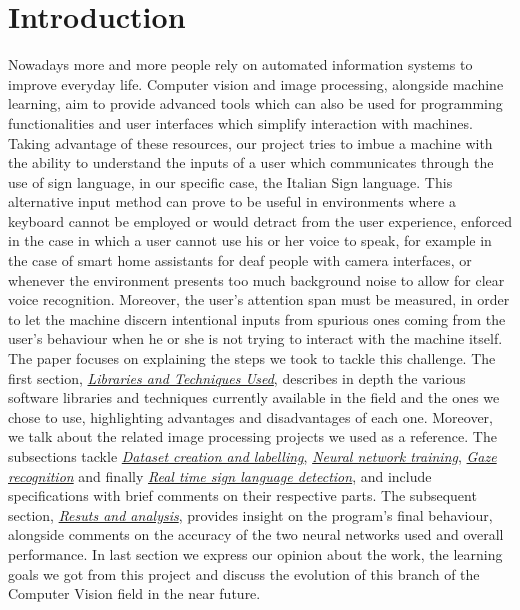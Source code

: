 \documentclass[a4paper, 12pt]{article}
\begin{document}
\section{Introduction}
\label{Introduction}
Nowadays more and more people rely on automated information systems to improve everyday life.
Computer vision and image processing, alongside machine learning, aim to provide advanced tools which can also be used for programming functionalities and user interfaces which simplify interaction with machines.
Taking advantage of these resources, our project tries to imbue a machine with the ability to understand the inputs of a user which communicates through the use of sign language, in our specific case, the Italian Sign language. This alternative input method can prove to be useful in environments where a keyboard cannot be employed or would detract from the user experience, enforced in the case in which a user cannot use his or her voice to speak, for example in the case of smart home assistants for deaf people with camera interfaces, or whenever the environment presents too much background noise to allow for clear voice recognition. Moreover, the user's attention span must be measured, in order to let the machine discern intentional inputs from spurious ones coming from the user's behaviour when he or she is not trying to interact with the machine itself.
The paper focuses on explaining the steps we took to tackle this challenge. The first section, \textit{\hyperref[LibsAndTech]{Libraries and Techniques Used}}, describes in depth the various software libraries and techniques currently available in the field and the ones we chose to use, highlighting advantages and disadvantages of each one. Moreover, we talk about the related image processing projects we used as a reference.\linebreak
The subsections tackle \textit{\hyperref[DatasetCreationLabel]{Dataset creation and labelling}}, \textit{\hyperref[NeuralNetworkTraining]{Neural network training}}, \textit{\hyperref[GazeRec]{Gaze recognition}} and finally \textit{\hyperref[RTSignDetect]{Real time sign language detection}}, and include specifications with brief comments on their respective parts.\linebreak
The subsequent section, \textit{\hyperref[ResutsAndAnalysis]{Resuts and analysis}}, provides insight on the program's final behaviour, alongside comments on the accuracy of the two neural networks used and overall performance.
In last section we express our opinion about the work, the learning goals we got from this project and discuss the evolution of this branch of the Computer Vision field in the near future.\linebreak
\end{document}
